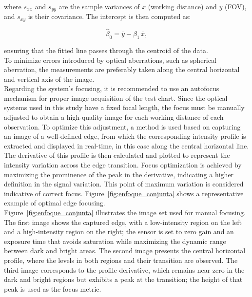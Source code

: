 \noindent where $s_{xx}$ and $s_{yy}$ are the sample variances of $x$ (working distance) and $y$ (FOV), and $s_{xy}$ is their covariance. The intercept is then computed as:

\begin{equation}
\hat{\beta}_0 = \bar{y} - \hat{\beta}_1\,\bar{x},
\end{equation}

\noindent ensuring that the fitted line passes through the centroid of the data.\\

\noindent To minimize errors introduced by optical aberrations, such as spherical aberration, the measurements are preferably taken along the central horizontal and vertical axis of the image.\\

\noindent Regarding the system's focusing, it is recommended to use an autofocus mechanism for proper image acquisition of the test chart. Since the optical systems used in this study have a fixed focal length, the focus must be manually adjusted to obtain a high-quality image for each working distance of each observation. To optimize this adjustment, a method is used based on capturing an image of a well-defined edge, from which the corresponding intensity profile is extracted and displayed in real-time, in this case along the central horizontal line. The derivative of this profile is then calculated and plotted to represent the intensity variation across the edge transition. Focus optimization is achieved by maximizing the prominence of the peak in the derivative, indicating a higher definition in the signal variation. This point of maximum variation is considered indicative of correct focus. Figure~\ref{fig:enfoque_conjunta} shows a representative example of optimal edge focusing.\\

\noindent Figure~\ref{fig:enfoque_conjunta} illustrates the image set used for manual focusing. The first image shows the captured edge, with a low-intensity region on the left and a high-intensity region on the right; the sensor is set to zero gain and an exposure time that avoids saturation while maximizing the dynamic range between dark and bright areas. The second image presents the central horizontal profile, where the levels in both regions and their transition are observed. The third image corresponds to the profile derivative, which remains near zero in the dark and bright regions but exhibits a peak at the transition; the height of that peak is used as the focus metric.\\


